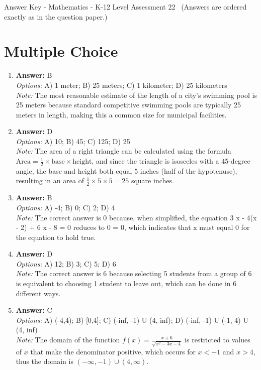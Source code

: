 \documentclass[12pt]{article}
\begin{document}
\begin{center}
Answer Key - Mathematics - K-12 Level Assessment 22 \
\small (Answers are ordered exactly as in the question paper.)
\end{center}

\section*{Multiple Choice}
\begin{enumerate}[label=\arabic*.]
\item \textbf{Answer:} B
\\ \textit{Options:} A) 1 meter; B) 25 meters; C) 1 kilometer; D) 25 kilometers
\\ \textit{Note:} The most reasonable estimate of the length of a city's swimming pool is 25 meters because standard competitive swimming pools are typically 25 meters in length, making this a common size for municipal facilities.
\item \textbf{Answer:} D
\\ \textit{Options:} A) 10; B) 45; C) 125; D) 25
\\ \textit{Note:} The area of a right triangle can be calculated using the formula \( \text{Area} = \frac{1}{2} \times \text{base} \times \text{height} \), and since the triangle is isosceles with a 45-degree angle, the base and height both equal \( 5 \) inches (half of the hypotenuse), resulting in an area of \( \frac{1}{2} \times 5 \times 5 = 25 \) square inches.
\item \textbf{Answer:} B
\\ \textit{Options:} A) -4; B) 0; C) 2; D) 4
\\ \textit{Note:} The correct answer is 0 because, when simplified, the equation 3 x - 4(x - 2) + 6 x - 8 = 0 reduces to 0 = 0, which indicates that x must equal 0 for the equation to hold true.
\item \textbf{Answer:} D
\\ \textit{Options:} A) 12; B) 3; C) 5; D) 6
\\ \textit{Note:} The correct answer is 6 because selecting 5 students from a group of 6 is equivalent to choosing 1 student to leave out, which can be done in 6 different ways.
\item \textbf{Answer:} C
\\ \textit{Options:} A) (-4,4); B) [0,4]; C) (-inf, -1) U (4, inf); D) (-inf, -1) U (-1, 4) U (4, inf)
\\ \textit{Note:} The domain of the function \( f(x) = \frac{x+6}{\sqrt{x^2-3 x-4}} \) is restricted to values of \( x \) that make the denominator positive, which occurs for \( x < -1 \) and \( x > 4 \), thus the domain is \( (-\infty, -1) \cup (4, \infty) \).
\end{enumerate}
\end{document}
